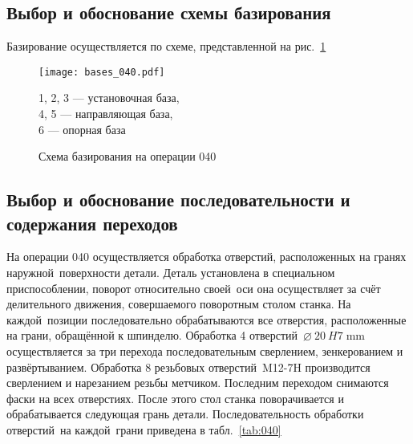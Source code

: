 \documentclass[14pt,russian,a4paper]{extreport}
\begin{document}
\newpage
\subsection{Выбор и обоснование схемы базирования}

Базирование осуществляется по схеме, представленной на рис.~\ref{fig:b040}

\begin{figure}[H]
	\centering
	   \texttt{[image: bases\_040.pdf]}
	   \caption{Схема базирования на операции 040}
	   \label{fig:b040}
	   1, 2, 3 --- установочная база, \\
	   4, 5 --- направляющая база, \\
	   6 --- опорная база
\end{figure}

\subsection{Выбор и обоснование последовательности и содержания переходов}

На операции 040 осуществляется обработка отверстий, расположенных на гранях наружной поверхности детали. Деталь установлена в специальном приспособлении, поворот относительно своей оси она осуществляет за счёт делительного движения, совершаемого поворотным столом станка. На каждой позиции последовательно обрабатываются все отверстия, расположенные на грани, обращённой к шпинделю. Обработка 4 отверстий $\SI{20}[\diameter]{H7 \; \milli\meter}$ осуществляется за три перехода последовательным сверлением, зенкерованием и развёртыванием. Обработка 8 резьбовых отверстий M12-7H производится сверлением и нарезанием резьбы метчиком. Последним переходом снимаются фаски на всех отверстиях. После этого стол станка поворачивается и обрабатывается следующая грань детали. Последовательность обработки отверстий на каждой грани приведена в табл.~\ref{tab:040}
\end{document}
